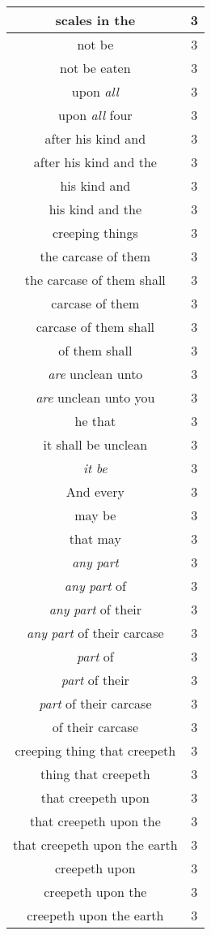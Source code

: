 \begin{center}
\begin{longtable}{|c|c|}
scales in the & 3\\ \hline 
not be & 3\\ \hline 
not be eaten & 3\\ \hline 
upon \emph{all} & 3\\ \hline 
upon \emph{all} four & 3\\ \hline 
after his kind and & 3\\ \hline 
after his kind and the & 3\\ \hline 
his kind and & 3\\ \hline 
his kind and the & 3\\ \hline 
creeping things & 3\\ \hline 
the carcase of them & 3\\ \hline 
the carcase of them shall & 3\\ \hline 
carcase of them & 3\\ \hline 
carcase of them shall & 3\\ \hline 
of them shall & 3\\ \hline 
\emph{are} unclean unto & 3\\ \hline 
\emph{are} unclean unto you & 3\\ \hline 
he that & 3\\ \hline 
it shall be unclean & 3\\ \hline 
\emph{it} \emph{be} & 3\\ \hline 
And every & 3\\ \hline 
may be & 3\\ \hline 
that may & 3\\ \hline 
\emph{any} \emph{part} & 3\\ \hline 
\emph{any} \emph{part} of & 3\\ \hline 
\emph{any} \emph{part} of their & 3\\ \hline 
\emph{any} \emph{part} of their carcase & 3\\ \hline 
\emph{part} of & 3\\ \hline 
\emph{part} of their & 3\\ \hline 
\emph{part} of their carcase & 3\\ \hline 
of their carcase & 3\\ \hline 
creeping thing that creepeth & 3\\ \hline 
thing that creepeth & 3\\ \hline 
that creepeth upon & 3\\ \hline 
that creepeth upon the & 3\\ \hline 
that creepeth upon the earth & 3\\ \hline 
creepeth upon & 3\\ \hline 
creepeth upon the & 3\\ \hline 
creepeth upon the earth & 3\\ \hline 
\end{longtable}
\end{center}





